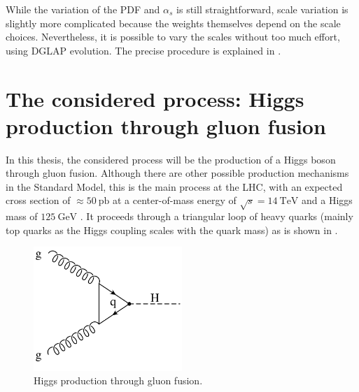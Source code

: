 While the variation of the PDF and $\alpha_s$ is still straightforward, scale variation is slightly more complicated because the weights themselves depend on the scale choices.
Nevertheless, it is possible to vary the scales without too much effort, using DGLAP evolution.
The precise procedure is explained in \cite{applgrid2010}.
%
\section{The considered process: Higgs production through gluon fusion}
In this thesis, the considered process will be the production of a Higgs boson through gluon fusion.
Although there are other possible production mechanisms in the Standard Model, this is the main process at the LHC, with an expected cross section of $\approx \SI{50}{\pico\barn}$ at a center-of-mass energy of $\sqrt{s} = \SI{14}{\tera\electronvolt}$ and a Higgs mass of $\SI{125}{\giga\electronvolt}$ \cite{higgshandbook1}.
It proceeds through a triangular loop of heavy quarks (mainly top quarks as the Higgs coupling scales with the quark mass) as is shown in .
%
\begin{figure}[]
	\includegraphics[width=0.5\textwidth]{images/gluonfusion.pdf}
	\caption{Higgs production through gluon fusion.}
	\label{fig:gluonfusion}
\end{figure}
%

